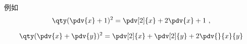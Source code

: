 
\begin{issues}
\issueDraft
\end{issues}


例如
\begin{equation}
\qty(\pdv{x} + 1)^2 = \pdv[2]{x} + 2\pdv{x} + 1~,
\end{equation}


\begin{equation}
\qty(\pdv{x} + \pdv{y})^2 = \pdv[2]{x} + \pdv[2]{y} + 2\pdv{}{x}{y}
\end{equation}
